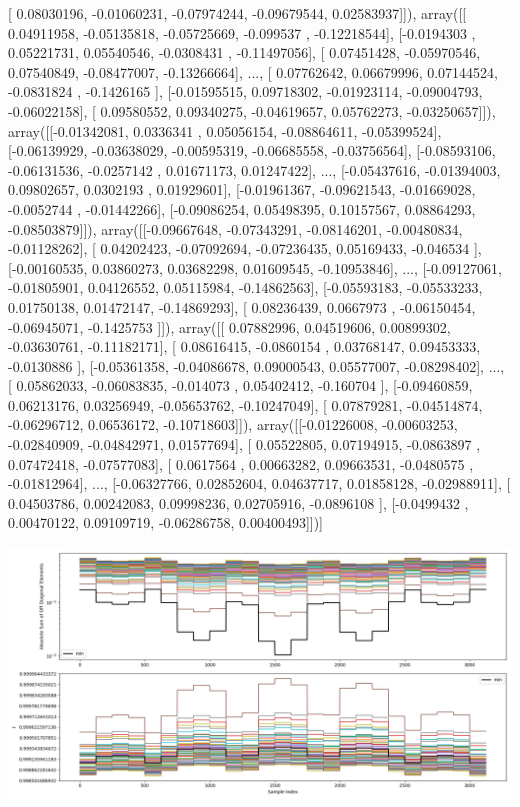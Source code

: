 \documentclass{article}
\begin{document}
       [ 0.08030196, -0.01060231, -0.07974244, -0.09679544,  0.02583937]]), array([[ 0.04911958, -0.05135818, -0.05725669, -0.099537  , -0.12218544],
       [-0.0194303 ,  0.05221731,  0.05540546, -0.0308431 , -0.11497056],
       [ 0.07451428, -0.05970546,  0.07540849, -0.08477007, -0.13266664],
       ..., 
       [ 0.07762642,  0.06679996,  0.07144524, -0.0831824 , -0.1426165 ],
       [-0.01595515,  0.09718302, -0.01923114, -0.09004793, -0.06022158],
       [ 0.09580552,  0.09340275, -0.04619657,  0.05762273, -0.03250657]]), array([[-0.01342081,  0.0336341 ,  0.05056154, -0.08864611, -0.05399524],
       [-0.06139929, -0.03638029, -0.00595319, -0.06685558, -0.03756564],
       [-0.08593106, -0.06131536, -0.0257142 ,  0.01671173,  0.01247422],
       ..., 
       [-0.05437616, -0.01394003,  0.09802657,  0.0302193 ,  0.01929601],
       [-0.01961367, -0.09621543, -0.01669028, -0.0052744 , -0.01442266],
       [-0.09086254,  0.05498395,  0.10157567,  0.08864293, -0.08503879]]), array([[-0.09667648, -0.07343291, -0.08146201, -0.00480834, -0.01128262],
       [ 0.04202423, -0.07092694, -0.07236435,  0.05169433, -0.046534  ],
       [-0.00160535,  0.03860273,  0.03682298,  0.01609545, -0.10953846],
       ..., 
       [-0.09127061, -0.01805901,  0.04126552,  0.05115984, -0.14862563],
       [-0.05593183, -0.05533233,  0.01750138,  0.01472147, -0.14869293],
       [ 0.08236439,  0.0667973 , -0.06150454, -0.06945071, -0.1425753 ]]), array([[ 0.07882996,  0.04519606,  0.00899302, -0.03630761, -0.11182171],
       [ 0.08616415, -0.0860154 ,  0.03768147,  0.09453333, -0.0130886 ],
       [-0.05361358, -0.04086678,  0.09000543,  0.05577007, -0.08298402],
       ..., 
       [ 0.05862033, -0.06083835, -0.014073  ,  0.05402412, -0.160704  ],
       [-0.09460859,  0.06213176,  0.03256949, -0.05653762, -0.10247049],
       [ 0.07879281, -0.04514874, -0.06296712,  0.06536172, -0.10718603]]), array([[-0.01226008, -0.00603253, -0.02840909, -0.04842971,  0.01577694],
       [ 0.05522805,  0.07194915, -0.0863897 ,  0.07472418, -0.07577083],
       [ 0.0617564 ,  0.00663282,  0.09663531, -0.0480575 , -0.01812964],
       ..., 
       [-0.06327766,  0.02852604,  0.04637717,  0.01858128, -0.02988911],
       [ 0.04503786,  0.00242083,  0.09998236,  0.02705916, -0.0896108 ],
       [-0.0499432 ,  0.00470122,  0.09109719, -0.06286758,  0.00400493]])]
\begin{center}
\includegraphics[scale=.9]{report_pickled_controls258/control_dpn_all.png}

\end{center}
\end{document}
